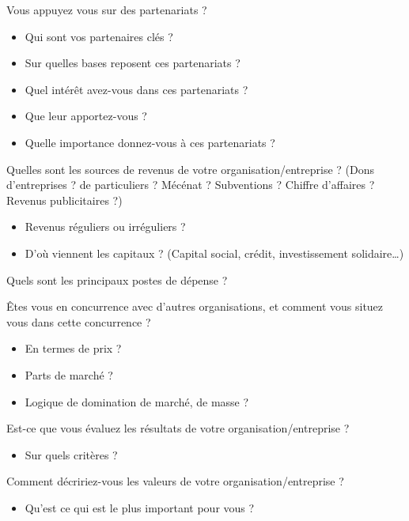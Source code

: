 Vous appuyez vous sur des partenariats ? 
\begin{itemize}
    \item Qui sont vos partenaires clés ? 
    \item Sur quelles bases reposent ces partenariats ? 
    \item Quel intérêt avez-vous dans ces partenariats ? 
    \item Que leur apportez-vous ? 
    \item Quelle importance donnez-vous à ces partenariats ?  \\
\end{itemize}
	
Quelles sont les sources de revenus de votre organisation/entreprise ? (Dons d’entreprises ? de particuliers ? Mécénat ? Subventions ? Chiffre d’affaires ? Revenus publicitaires ?)
    \begin{itemize}
        \item Revenus réguliers ou irréguliers ? 
        \item D’où viennent les capitaux ? (Capital social, crédit, investissement solidaire…) \\
    \end{itemize}

Quels sont les principaux postes de dépense ? 

Êtes vous en concurrence avec d’autres organisations, et comment vous situez vous dans cette concurrence ? 
    \begin{itemize}
        \item En termes de prix ? 
        \item Parts de marché ? 
        \item Logique de domination de marché, de masse ?  \\
    \end{itemize}
	
Est-ce que vous évaluez les résultats de votre organisation/entreprise ? 
    \begin{itemize}
        \item Sur quels critères ? \\
    \end{itemize}

Comment décririez-vous les valeurs de votre organisation/entreprise ? 
    \begin{itemize}
        \item Qu’est ce qui est le plus important pour vous ? \\
    \end{itemize}

